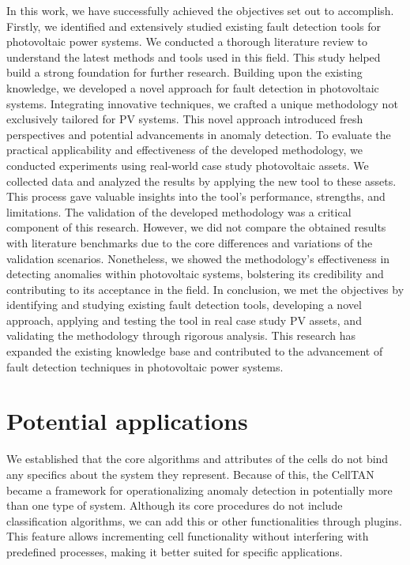 In this work, we have successfully achieved the objectives set out to accomplish. Firstly, we identified and extensively studied existing fault detection tools for photovoltaic power systems. We conducted a thorough literature review to understand the latest methods and tools used in this field. This study helped build a strong foundation for further research.
Building upon the existing knowledge, we developed a novel approach for fault detection in photovoltaic systems. Integrating innovative techniques, we crafted a unique methodology not exclusively tailored for PV systems. This novel approach introduced fresh perspectives and potential advancements in anomaly detection.
To evaluate the practical applicability and effectiveness of the developed methodology, we conducted experiments using real-world case study photovoltaic assets. We collected data and analyzed the results by applying the new tool to these assets. This process gave valuable insights into the tool's performance, strengths, and limitations. The validation of the developed methodology was a critical component of this research. However, we did not compare the obtained results with literature benchmarks due to the core differences and variations of the validation scenarios. Nonetheless, we showed the methodology's effectiveness in detecting anomalies within photovoltaic systems, bolstering its credibility and contributing to its acceptance in the field.
In conclusion, we met the objectives by identifying and studying existing fault detection tools, developing a novel approach, applying and testing the tool in real case study PV assets, and validating the methodology through rigorous analysis. This research has expanded the existing knowledge base and contributed to the advancement of fault detection techniques in photovoltaic power systems.

\section{Potential applications}


We established that the core algorithms and attributes of the cells do not bind any specifics about the system they represent. Because of this, the CellTAN became a framework for operationalizing anomaly detection in potentially more than one type of system. Although its core procedures do not include classification algorithms, we can add this or other functionalities through plugins. This feature allows incrementing cell functionality without interfering with predefined processes, making it better suited for specific applications.

